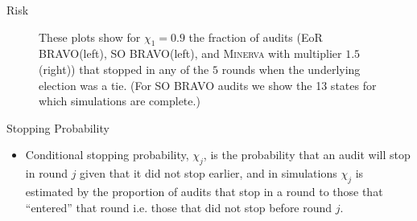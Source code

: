 \documentclass[final]{beamer}
\newcommand{\Minerva}{\textsc{Minerva}\xspace}
\newcommand{\BRAVO}{\textsc{BRAVO}\xspace}
\newlength{\colwidth}
\begin{document}
\begin{frame}[t]
\begin{columns}[t]
\begin{column}{\colwidth}
\begin{block}{Risk}
\begin{figure}[h]
\begin{minipage}{.49\textwidth}
\label{fig:minerva_risk}
\end{minipage}
\caption{These plots show for $\chi_1=0.9$ the fraction of audits (EoR \BRAVO (left), SO \BRAVO (left), and \Minerva with multiplier $1.5$ (right)) that stopped in any of the $5$ rounds when the underlying election was a tie. (For SO \BRAVO audits we show the 13 states for which simulations are complete.)}
\end{figure}

\end{block}


\begin{block}{Stopping Probability}

\begin{itemize}
\item
Conditional stopping probability, $\chi_j$, is the probability that an audit will stop in round $j$ given that it did not stop earlier, and in 
simulations $\chi_j$ is estimated by the proportion of audits that stop in a round to those that ``entered'' that round
i.e. those that did not stop before round $j$. 
\end{itemize}


\end{block}
\end{column}
\end{columns}
\end{frame}
\end{document}
